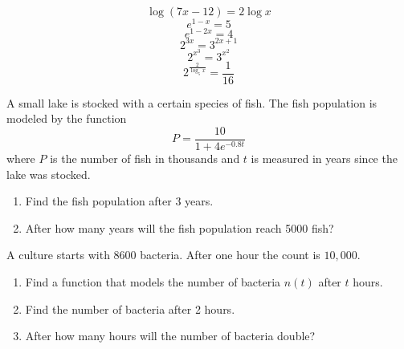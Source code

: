 \documentclass[11pt]{article}
\begin{document}
  \begin{equation}
    \label{eq:eequabae}
    \log(7x-12)=2\log{}x
  \end{equation}
  \begin{equation}
    \label{eq:niephait}
    e^{1-x}=5
  \end{equation}
  \begin{equation}
    \label{eq:eophooki}
    e^{1-2x}=4
  \end{equation}
  \begin{equation}
    \label{eq:eevaicei}
    2^{3x}=3^{2x+1}
  \end{equation}
  \begin{equation}
    \label{eq:ohquaiva}
    2^{x^{3}}=3^{x^{2}}
  \end{equation}
  \begin{equation}
    \label{eq:poikeeng}
    2^{\frac{2}{\log_{5}x}}=\frac{1}{16}
  \end{equation}

  A small lake is stocked with a certain species of fish. The fish
  population is modeled by the function
  \begin{equation}
    \label{eq:peongeex}
    P=\frac{10}{1+4e^{-0.8t}}
  \end{equation}
where $P$ is the number of fish in thousands and $t$ is measured in
years since the lake was stocked.
\begin{enumerate}
\item Find the fish population after 3 years.
\item After how many years will the fish population reach 5000 fish?
\end{enumerate}

A culture starts with 8600 bacteria. After one hour the count is
$10,000$.
\begin{enumerate}
\item Find a function that models the number of bacteria $n(t)$ after $t$ hours.
\item Find the number of bacteria after 2 hours.
\item After how many hours will the number of bacteria double?
\end{enumerate}

\end{document}
